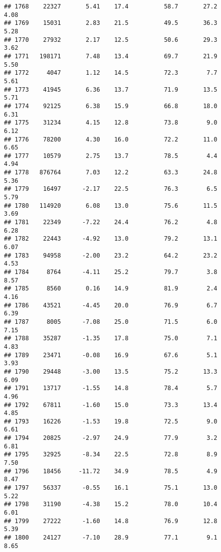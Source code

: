 \documentclass[
]{article}
\begin{document}
\begin{verbatim}
## 1768    22327       5.41    17.4          58.7       27.2              4.08
## 1769    15031       2.83    21.5          49.5       36.3              5.28
## 1770    27932       2.17    12.5          50.6       29.3              3.62
## 1771   198171       7.48    13.4          69.7       21.9              5.50
## 1772     4047       1.12    14.5          72.3        7.7              5.61
## 1773    41945       6.36    13.7          71.9       13.5              5.71
## 1774    92125       6.38    15.9          66.8       18.0              6.31
## 1775    31234       4.15    12.8          73.8        9.0              6.12
## 1776    78200       4.30    16.0          72.2       11.0              6.65
## 1777    10579       2.75    13.7          78.5        4.4              4.94
## 1778   876764       7.03    12.2          63.3       24.8              5.36
## 1779    16497      -2.17    22.5          76.3        6.5              5.79
## 1780   114920       6.08    13.0          75.6       11.5              3.69
## 1781    22349      -7.22    24.4          76.2        4.8              6.28
## 1782    22443      -4.92    13.0          79.2       13.1              6.07
## 1783    94958      -2.00    23.2          64.2       23.2              4.53
## 1784     8764      -4.11    25.2          79.7        3.8              8.57
## 1785     8560       0.16    14.9          81.9        2.4              4.16
## 1786    43521      -4.45    20.0          76.9        6.7              6.39
## 1787     8005      -7.08    25.0          71.5        6.0              7.15
## 1788    35287      -1.35    17.8          75.0        7.1              4.83
## 1789    23471      -0.08    16.9          67.6        5.1              3.93
## 1790    29448      -3.00    13.5          75.2       13.3              6.09
## 1791    13717      -1.55    14.8          78.4        5.7              4.96
## 1792    67811      -1.60    15.0          73.3       13.4              4.85
## 1793    16226      -1.53    19.8          72.5        9.0              6.61
## 1794    20825      -2.97    24.9          77.9        3.2              6.81
## 1795    32925      -8.34    22.5          72.8        8.9              7.50
## 1796    18456     -11.72    34.9          78.5        4.9              8.47
## 1797    56337      -0.55    16.1          75.1       13.0              5.22
## 1798    31190      -4.38    15.2          78.0       10.4              6.01
## 1799    27222      -1.60    14.8          76.9       12.8              5.39
## 1800    24127      -7.10    28.9          77.1        9.1              8.65

\end{verbatim}
\end{document}
